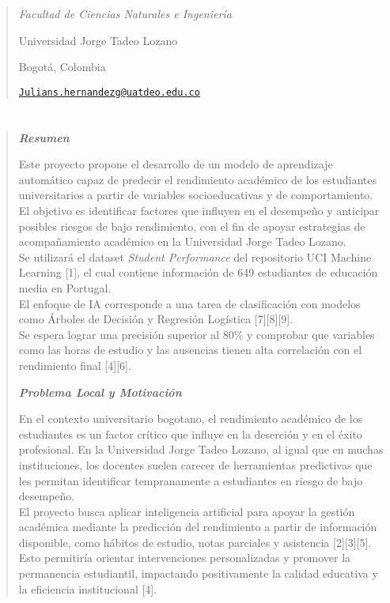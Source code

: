 \documentclass[
]{article}
\begin{document}
\begin{quote}
\emph{Facultad de Ciencias Naturales e Ingeniería}

Universidad Jorge Tadeo Lozano

Bogotá, Colombia

\href{mailto:Julians.hernandezg@uatdeo.edu.co}{\nolinkurl{Julians.hernandezg@uatdeo.edu.co}}
\end{quote}

\hypertarget{section}{%
\section{}\label{section}}

\begin{quote}
\emph{\textbf{Resumen}}

Este proyecto propone el desarrollo de un modelo de aprendizaje
automático capaz de predecir el rendimiento académico de los estudiantes
universitarios a partir de variables socioeducativas y de
comportamiento. El objetivo es identificar factores que influyen en el
desempeño y anticipar posibles riesgos de bajo rendimiento, con el fin
de apoyar estrategias de acompañamiento académico en la Universidad
Jorge Tadeo Lozano.\\
Se utilizará el dataset \emph{Student Performance} del repositorio UCI
Machine Learning {[}1{]}, el cual contiene información de 649
estudiantes de educación media en Portugal.\\
El enfoque de IA corresponde a una tarea de clasificación con modelos
como Árboles de Decisión y Regresión Logística {[}7{]}{[}8{]}{[}9{]}.\\
Se espera lograr una precisión superior al 80\% y comprobar que
variables como las horas de estudio y las ausencias tienen alta
correlación con el rendimiento final {[}4{]}{[}6{]}.

\emph{\textbf{Problema Local y Motivación}}

En el contexto universitario bogotano, el rendimiento académico de los
estudiantes es un factor crítico que influye en la deserción y en el
éxito profesional. En la Universidad Jorge Tadeo Lozano, al igual que en
muchas instituciones, los docentes suelen carecer de herramientas
predictivas que les permitan identificar tempranamente a estudiantes en
riesgo de bajo desempeño.\\
El proyecto busca aplicar inteligencia artificial para apoyar la gestión
académica mediante la predicción del rendimiento a partir de información
disponible, como hábitos de estudio, notas parciales y asistencia
{[}2{]}{[}3{]}{[}5{]}.\\
Esto permitiría orientar intervenciones personalizadas y promover la
permanencia estudiantil, impactando positivamente la calidad educativa y
la eficiencia institucional {[}4{]}.


\end{quote}
\end{document}
